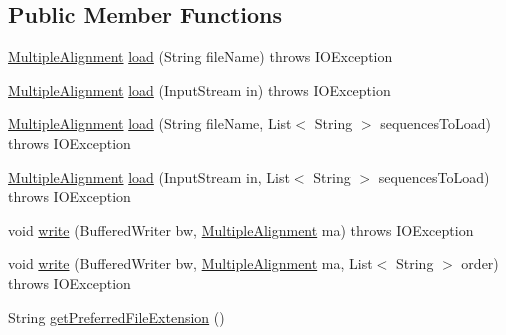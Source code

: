 \subsection*{Public Member Functions}
\begin{DoxyCompactItemize}
\item 
\hyperlink{classbroad_1_1core_1_1multiplealignment_1_1_multiple_alignment}{Multiple\+Alignment} \hyperlink{classbroad_1_1core_1_1multiplealignment_1_1_phylip_sequencial_multiple_alignment_i_o_a9ec03c7c1b50256551a71bdbf6e1493d}{load} (String file\+Name)  throws I\+O\+Exception 
\item 
\hyperlink{classbroad_1_1core_1_1multiplealignment_1_1_multiple_alignment}{Multiple\+Alignment} \hyperlink{classbroad_1_1core_1_1multiplealignment_1_1_phylip_sequencial_multiple_alignment_i_o_ac4a8e59da3495a432111ff6a7624a271}{load} (Input\+Stream in)  throws I\+O\+Exception 
\item 
\hyperlink{classbroad_1_1core_1_1multiplealignment_1_1_multiple_alignment}{Multiple\+Alignment} \hyperlink{classbroad_1_1core_1_1multiplealignment_1_1_phylip_sequencial_multiple_alignment_i_o_aa23fc2587b84c86f52e6c4445d34dbbb}{load} (String file\+Name, List$<$ String $>$ sequences\+To\+Load)  throws I\+O\+Exception 
\item 
\hyperlink{classbroad_1_1core_1_1multiplealignment_1_1_multiple_alignment}{Multiple\+Alignment} \hyperlink{classbroad_1_1core_1_1multiplealignment_1_1_phylip_sequencial_multiple_alignment_i_o_ac46d41280c47168e02eb4ecaec40a83d}{load} (Input\+Stream in, List$<$ String $>$ sequences\+To\+Load)  throws I\+O\+Exception 
\item 
void \hyperlink{classbroad_1_1core_1_1multiplealignment_1_1_phylip_sequencial_multiple_alignment_i_o_a49710b5d0f53a6e6798eb753d9e04c94}{write} (Buffered\+Writer bw, \hyperlink{classbroad_1_1core_1_1multiplealignment_1_1_multiple_alignment}{Multiple\+Alignment} ma)  throws I\+O\+Exception 
\item 
void \hyperlink{classbroad_1_1core_1_1multiplealignment_1_1_phylip_sequencial_multiple_alignment_i_o_a482b0028805d6dcefc1198971896d82f}{write} (Buffered\+Writer bw, \hyperlink{classbroad_1_1core_1_1multiplealignment_1_1_multiple_alignment}{Multiple\+Alignment} ma, List$<$ String $>$ order)  throws I\+O\+Exception 
\item 
String \hyperlink{classbroad_1_1core_1_1multiplealignment_1_1_phylip_sequencial_multiple_alignment_i_o_a2fa2d40e02fb7a1485a39bf5049507aa}{get\+Preferred\+File\+Extension} ()
\end{DoxyCompactItemize}


